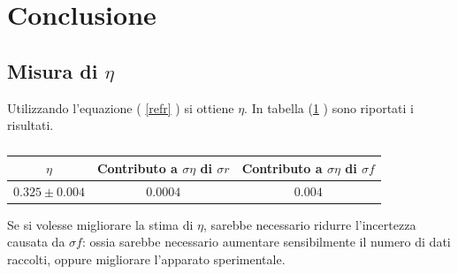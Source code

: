 \documentclass{article}
\begin{document}
\section{Conclusione}
\subsection{Misura di $\eta$}
Utilizzando l'equazione  ( \ref{refr} ) si ottiene $\eta$. 
In tabella (\ref{etameas} ) sono riportati i risultati.

		\begin{table}
			\centering
				\begin{tabular}{|c|c|c|}

					\hline
						$\eta$  & Contributo a $\sigma \eta$ di $\sigma r$ & Contributo a $\sigma \eta$ di $\sigma f$\\
					\hline
			
						$0.325\pm0.004$ & $ 0.0004$ & $ 0.004$\\
					\hline
			
				\end{tabular}
					\caption{}
					\label{etameas}
		
		\end{table}		

Se si volesse migliorare la stima di $\eta$, sarebbe necessario ridurre l'incertezza causata da $\sigma f$: ossia sarebbe necessario aumentare sensibilmente il numero di dati raccolti, oppure migliorare l'apparato sperimentale.
\end{document}
